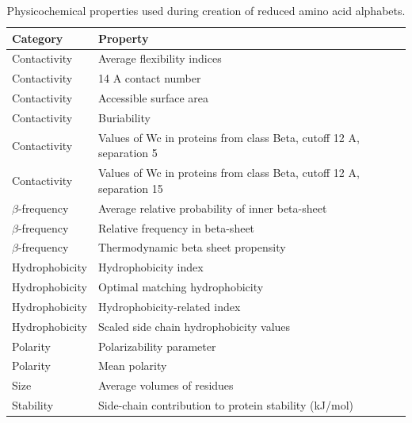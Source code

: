 \documentclass{bioinfo}
\begin{document}
\begin{methods}
\begin{table}[ht]
\centering
\begin{tabular}{ll}
  \hline
Category & Property \\ 
  \hline
  Contactivity & Average flexibility indices \citep{bhaskaran_positional_1988} \\ 
  Contactivity & 14 A contact number \citep{nishikawa_radial_1986} \\ 
  Contactivity & Accessible surface area \citep{radzicka_comparing_1988} \\ 
    Contactivity & Buriability \citep{zhou_quantifying_2004} \\ 
  Contactivity & Values of Wc in proteins from class Beta, cutoff 12 A, separation 5 \citep{wozniak_characteristics_2014} \\ 
  Contactivity & Values of Wc in proteins from class Beta, cutoff 12 A, separation 15 \citep{wozniak_characteristics_2014} \\ 
  $\beta$-frequency & Average relative probability of inner beta-sheet \citep{kanehisa_local_1980} \\ 
  $\beta$-frequency & Relative frequency in beta-sheet \citep{prabhakaran_distribution_1990} \\ 
  $\beta$-frequency & Thermodynamic beta sheet propensity \citep{kim_thermodynamic_1993} \\ 
  Hydrophobicity & Hydrophobicity index \citep{argos_structural_1982} \\ 
  Hydrophobicity & Optimal matching hydrophobicity \citep{sweet_correlation_1983} \\ 
  Hydrophobicity & Hydrophobicity-related index \citep{kidera_statistical_1985} \\ 
  Hydrophobicity & Scaled side chain hydrophobicity values \citep{black_development_1991} \\ 
  Polarity & Polarizability parameter \citep{charton_structural_1982} \\ 
  Polarity & Mean polarity \citep{radzicka_comparing_1988} \\ 
  Size & Average volumes of residues \citep{pontius_deviations_1996} \\ 
  Stability & Side-chain contribution to protein stability (kJ/mol) \citep{takano_new_2001} \\ 
   \hline
\end{tabular}
\caption{Physicochemical properties used during creation of reduced amino acid alphabets.} 
\end{table}


\end{methods}
\end{document}
